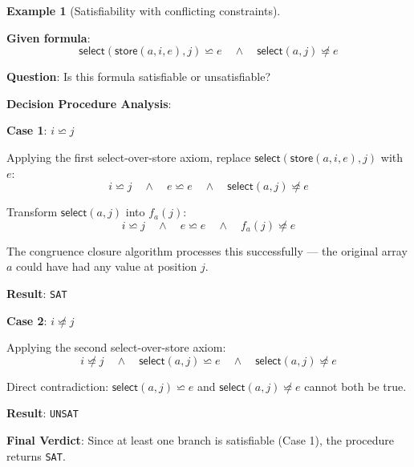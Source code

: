 \documentclass[11pt,a4paper]{article}
\theoremstyle{definition}
\newtheorem{example}{Example}[section]
\theoremstyle{plain}
\theoremstyle{remark}
\begin{document}
\newpage

\begin{example}[Satisfiability with conflicting constraints]
\begin{tcolorbox}[colback=green!5!white,colframe=green!75!black,title=\textbf{Example 2: SAT with Partial Contradiction},breakable]
\textbf{Given formula}:
\[
\textsf{select}(\textsf{store}(a, i, e), j) \backsimeq e \quad \wedge \quad \textsf{select}(a, j) \not\backsimeq e
\]

\textbf{Question}: Is this formula satisfiable or unsatisfiable?

\vspace{0.5em}

\textbf{Decision Procedure Analysis}:

\textbf{Case 1}: $i \backsimeq j$

Applying the first select-over-store axiom, replace $\textsf{select}(\textsf{store}(a, i, e), j)$ with $e$:
\[
i \backsimeq j \quad \wedge \quad e \backsimeq e \quad \wedge \quad \textsf{select}(a, j) \not\backsimeq e
\]

Transform $\textsf{select}(a, j)$ into $f_a(j)$:
\[
i \backsimeq j \quad \wedge \quad e \backsimeq e \quad \wedge \quad f_a(j) \not\backsimeq e
\]

The congruence closure algorithm processes this successfully — the original array $a$ could have had any value at position $j$.

\textbf{Result}: \texttt{SAT}

\vspace{0.3em}

\textbf{Case 2}: $i \not\backsimeq j$

Applying the second select-over-store axiom:
\[
i \not\backsimeq j \quad \wedge \quad \textsf{select}(a, j) \backsimeq e \quad \wedge \quad \textsf{select}(a, j) \not\backsimeq e
\]

Direct contradiction: $\textsf{select}(a, j) \backsimeq e$ and $\textsf{select}(a, j) \not\backsimeq e$ cannot both be true.

\textbf{Result}: \texttt{UNSAT}

\vspace{0.5em}

\textbf{Final Verdict}: Since at least one branch is satisfiable (Case 1), the procedure returns \texttt{SAT}.
\end{tcolorbox}
\end{example}

\newpage
\end{document}

